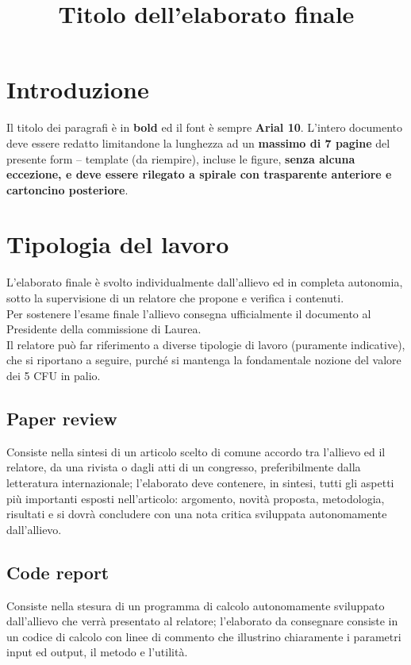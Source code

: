 \documentclass{baer}
\title{Titolo dell'elaborato finale}
\begin{document}
\maketitle

\section{Introduzione}



Il titolo dei paragrafi è in \textbf{bold} ed il font è sempre \textbf{Arial 10}.
L’intero documento deve essere redatto limitandone la
lunghezza ad un \textbf{massimo di 7 pagine} del presente form
– template (da riempire), incluse le figure, \textbf{senza alcuna
eccezione, e deve essere rilegato a spirale con trasparente anteriore e cartoncino posteriore}.

\section{Tipologia del lavoro}

L’elaborato finale è svolto individualmente dall’allievo ed
in completa autonomia, sotto la supervisione di un
relatore che propone e verifica i contenuti.\\
Per sostenere l’esame finale l’allievo consegna
ufficialmente il documento al Presidente della
commissione di Laurea.\\
Il relatore può far riferimento a diverse tipologie di lavoro
(puramente indicative), che si riportano a seguire, purché
si mantenga la fondamentale nozione del valore dei 5
CFU in palio.

\subsection{Paper review}
Consiste nella sintesi di un articolo scelto di comune
accordo tra l’allievo ed il relatore, da una rivista o dagli
atti di un congresso, preferibilmente dalla letteratura
internazionale; l’elaborato deve contenere, in sintesi, tutti
gli aspetti più importanti esposti nell’articolo: argomento,
novità proposta, metodologia, risultati e si dovrà
concludere con una nota critica sviluppata
autonomamente dall’allievo.

\subsection{Code report}
Consiste nella stesura di un programma di calcolo
autonomamente sviluppato dall’allievo che verrà
presentato al relatore; l’elaborato da consegnare consiste
in un codice di calcolo con linee di commento che
illustrino chiaramente i parametri input ed output, il
metodo e l’utilità.
\end{document}

